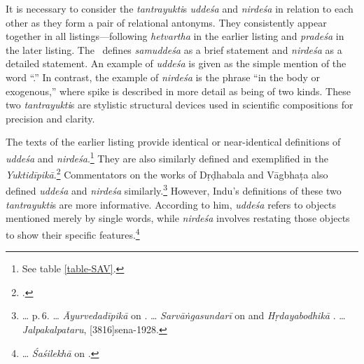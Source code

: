 It is necessary to consider the \emph{tantrayukti}s 
\emph{uddeśa} and \emph{nirdeśa} in relation to each other 
as they form a pair of relational antonyms. 
They consistently appear together in all listings---following \emph{hetvartha} 
in the earlier listing and \emph{pradeśa} in the later listing. 
The \SS\ defines \emph{samuddeśa} as a brief statement 
and \emph{nirdeśa} as a detailed statement. 
An example of \emph{uddeśa} is given as the simple mention of the word 
“.” 
In contrast, the example of \emph{nirdeśa} is the phrase “in the body or 
exogenous,” 
where spike is described in more detail as being of two kinds. 
These two \emph{tantrayukti}s are stylistic structural devices 
used in scientific compositions for precision and clarity.

The texts of the earlier listing provide identical or near-identical definitions 
of \emph{uddeśa} and \emph{nirdeśa}.\footnote{See table \ref{table-SAV}.} 
They are also similarly defined and exemplified in the 
\emph{Yuktidīpikā}.\footcite[7]{wezl-1998} 
Commentators on the works of Dṛḍhabala and Vāgbhaṭa 
also defined \emph{uddeśa} and \emph{nirdeśa} similarly.\footnote{%
	\ldots
		 p.\,6.	
	\ldots
		\emph{Āyurvedadīpikā} on . 
	\ldots
		\emph{Sarvāṅgasundarī} on  and 
		\emph{Hṛdayabodhikā} \parencite[2]{muss-1940}.
	\ldots
		\emph{Jalpakalpataru}, {sena-1928}.
	} 
However, Indu's definitions of these two \emph{tantrayukti}s are more 
informative. 
According to him, \emph{uddeśa} refers to objects mentioned merely by single 
words, 
while \emph{nirdeśa} involves restating those objects to show their specific 
features.\footnote{%
	\ldots
		\emph{Śaśilekhā} on .
	}

